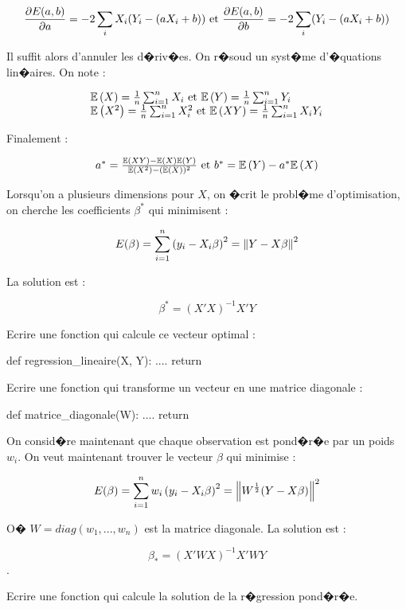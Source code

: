 \begin{xexercice}
$$
\frac{\partial E(a,b)}{\partial a} = - 2 \sum_i X_i ( Y_i - (a X_i + b))
\text{ et } \frac{\partial E(a,b)}{\partial b} = - 2 \sum_i ( Y_i - (a X_i + b))
$$

Il suffit alors d'annuler les d�riv�es. On r�soud un syst�me d'�quations lin�aires. On note :

$$
\begin{array}{l}
\mathbb{E}\left(X\right) = \frac{1}{n}\sum_{i=1}^n X_i \text{ et } \mathbb{E}\left(Y\right) = \frac{1}{n}\sum_{i=1}^n Y_i \\
\mathbb{E}\left(X^2\right) = \frac{1}{n}\sum_{i=1}^n X_i^2 \text{ et } \mathbb{E}\left(XY\right) = \frac{1}{n}\sum_{i=1}^n X_i Y_i 
\end{array}
$$

Finalement :

$$
\begin{array}{l}
a^* = \frac{ \mathbb{E}\left(XY\right) - \mathbb{E}\left(X\right) \mathbb{E}\left(Y\right)}{\mathbb{E}\left(X^2\right) - (\mathbb{E}\left(X\right))^2} \text{ et } b^* = \mathbb{E}\left(Y\right) - a^* \mathbb{E}\left(X\right)
\end{array}
$$

Lorsqu'on a plusieurs dimensions pour $X$, on �crit le probl�me d'optimisation, on cherche les coefficients $\beta^*$ qui minimisent :

$$E(\beta)=\sum_{i=1}^n \left(y_i - X_i \beta\right)^2 = \left\Vert Y - X\beta\right\Vert^2$$

La solution est : 

$$\beta^* = (X'X)^{-1}X'Y$$

Ecrire une fonction qui calcule ce vecteur optimal :

\begin{verbatimx}
def regression_lineaire(X, Y):
    ....
    return
\end{verbatimx}

\exequest Ecrire une fonction qui transforme un vecteur en une matrice diagonale :

\begin{verbatimx}
def matrice_diagonale(W):
    ....
    return
\end{verbatimx}


\exequest On consid�re maintenant que chaque observation est pond�r�e par un poids $w_i$. On veut maintenant trouver le vecteur $\beta$ qui minimise :

$$E(\beta)=\sum_{i=1}^n w_i \left(y_i - X_i \beta\right)^2 = \left\Vert W^{\frac{1}{2}}(Y - X\beta)\right\Vert^2$$

O� $W=diag(w_1, ..., w_n)$ est la matrice diagonale. La solution est :

$$\beta_* = (X'WX)^{-1}X'WY$$.

Ecrire une fonction qui calcule la solution de la r�gression pond�r�e.


\end{xexercice}
